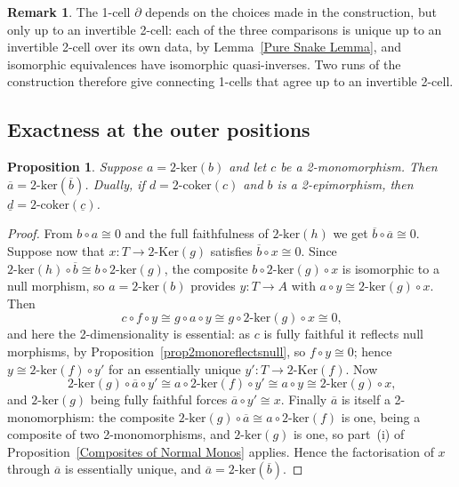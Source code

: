 \documentclass[reqno,a4paper]{amsart}
\numberwithin{equation}{section}
\theoremstyle{plain}
\newtheorem{proposition}[subsection]{Proposition}
\theoremstyle{definition}
\newtheorem{remark}[subsection]{Remark}
\def\nameit#1{\textrm{#1}~}
\def\prox{\nameit{Proposition}}
\def\lemx{\nameit{Lemma}}
\newcommand{\comp}{\circ}
\newcommand{\iso}{\cong}
\newcommand{\ov}[1]{\overline{#1}}
\renewcommand{\1}{\onecat{1}}
\newcommand{\TwoKer}{\ensuremath{2\text{-}\mathrm{Ker}}}
\newcommand{\twoker}{\ensuremath{2\text{-}\mathrm{ker}}}
\newcommand{\twocoker}{\ensuremath{2\text{-}\mathrm{coker}}}
\begin{document}
\begin{remark}\label{Rem Partial Choices}
	The 1-cell \(\partial\) depends on the choices made in the construction, but only up to an invertible 2-cell: each of the three comparisons is unique up to an invertible 2-cell over its own data, by \lemx\ref{Pure Snake Lemma}, and isomorphic equivalences have isomorphic quasi-inverses. Two runs of the construction therefore give connecting 1-cells that agree up to an invertible 2-cell.
\end{remark}

\subsection{Exactness at the outer positions}\label{SS:OuterExactness}

\begin{proposition}\label{P:KerBarA}
	Suppose \(a=\twoker(b)\) and let \(c\) be a 2-monomorphism. Then \(\ov{a}=\twoker(\ov{b})\). Dually, if \(d=\twocoker(c)\) and \(b\) is a 2-epimorphism, then \(\underline{d}=\twocoker(\underline{c})\).
\end{proposition}
\begin{proof}
	From \(b\comp a\iso 0\) and the full faithfulness of \(\twoker(h)\) we get \(\ov{b}\comp\ov{a}\iso 0\). Suppose now that \(x\colon T\to\TwoKer(g)\) satisfies \(\ov{b}\comp x\iso 0\). Since \(\twoker(h)\comp\ov{b}\iso b\comp\twoker(g)\), the composite \(b\comp\twoker(g)\comp x\) is isomorphic to a null morphism, so \(a=\twoker(b)\) provides \(y\colon T\to A\) with \(a\comp y\iso\twoker(g)\comp x\). Then
	\[
		c\comp f\comp y\iso g\comp a\comp y\iso g\comp\twoker(g)\comp x\iso 0\text{,}
	\]
	and here the 2-dimensionality is essential: as \(c\) is fully faithful it reflects null morphisms, by \prox\ref{prop2monoreflectsnull}, so \(f\comp y\iso 0\); hence \(y\iso\twoker(f)\comp y'\) for an essentially unique \(y'\colon T\to\TwoKer(f)\). Now
	\[
		\twoker(g)\comp\ov{a}\comp y'\iso a\comp\twoker(f)\comp y'\iso a\comp y\iso\twoker(g)\comp x\text{,}
	\]
	and \(\twoker(g)\) being fully faithful forces \(\ov{a}\comp y'\iso x\). Finally \(\ov{a}\) is itself a 2-monomorphism: the composite \(\twoker(g)\comp\ov{a}\iso a\comp\twoker(f)\) is one, being a composite of two 2-monomorphisms, and \(\twoker(g)\) is one, so part~\textup{(i)} of \prox\ref{Composites of Normal Monos} applies. Hence the factorisation of \(x\) through \(\ov{a}\) is essentially unique, and \(\ov{a}=\twoker(\ov{b})\).
\end{proof}
\end{document}
